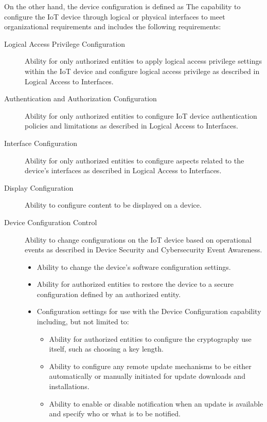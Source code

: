 On the other hand, the device configuration is defined as The capability to configure the IoT device through logical or physical interfaces to meet organizational requirements and includes the following requirements:
\begin{description}
    \item[Logical Access Privilege Configuration] Ability for only authorized entities to apply logical access privilege settings within the IoT device and configure logical access privilege as described in Logical Access to Interfaces.
    \item[Authentication and Authorization Configuration] Ability for only authorized entities to configure IoT device authentication policies and limitations as described in Logical Access to Interfaces.
    \item[Interface Configuration] Ability for only authorized entities to configure aspects related to the device’s interfaces as described in Logical Access to Interfaces.
    \item[Display Configuration] Ability to configure content to be displayed on a device.
    \item[Device Configuration Control] Ability to change configurations on the IoT device based on operational events as described in Device Security and Cybersecurity Event Awareness.
    \begin{itemize}
        \item Ability to change the device’s software configuration settings.
        \item Ability for authorized entities to restore the device to a secure configuration defined by an authorized entity.
        \item Configuration settings for use with the Device Configuration capability including, but not limited to:
        \begin{itemize}
            \item Ability for authorized entities to configure the cryptography use itself, such as choosing a key length.
            \item Ability to configure any remote update mechanisms to be either automatically or manually initiated for update downloads and installations.
            \item Ability to enable or disable notification when an update is available and specify who or what is to be notified.
        \end{itemize}
    \end{itemize}
\end{description}

